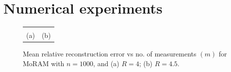 \section{Numerical experiments}
\label{sec:exp}
%			
\begin{figure}[!t]
	\begin{center}
		\setlength{\tabcolsep}{0pt}
		\renewcommand{\arraystretch}{0.5}
		\begin{tabular}{cc}
			\resizebox{0.5\linewidth}{!}{} &
			\resizebox{0.45\linewidth}{!}{} \\
			(a) & %
			(b) \\
		\end{tabular}
	\end{center}
	\caption{{Mean relative reconstruction error vs no. of measurements $(m)$ for MoRAM with $n=1000$, and (a) $R=4$; %
			(b) $R=4.5$.}}
	\label{fig:plot}
\end{figure}



